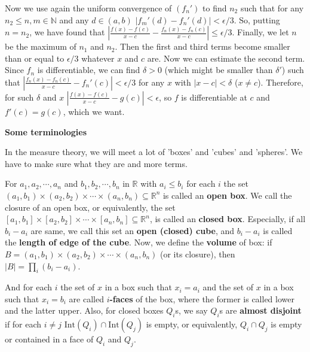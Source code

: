 \documentclass{article}
\newcommand{\NaN}{\mathbb{N}}
\newcommand{\ReR}{\mathbb{R}}
\begin{document}
Now we use again the uniform convergence of $(f_n')$ to find $n_2$ such that for any $n_2 \le n, m \in \NaN$ and any $d \in (a, b)$ $|f_m'(d) - f_n'(d)| < \epsilon/3$.
So, putting $n = n_2$, we have found that $|\frac{f(x) - f(c)}{x -c} - \frac{f_n(x) - f_n(c)}{x -c}| \le \epsilon/3$.
Finally, we let $n$ be the maximum of $n_1$ and $n_2$.
Then the first and third terms become smaller than or equal to $\epsilon/3$ whatever $x$ and $c$ are.
Now we can estimate the second term.
Since $f_n$ is differentiable, we can find $\delta > 0$ (which might be smaller than $\delta'$) such that $|\frac{f_n(x) - f_n(c)}{x -c} - f_n'(c)| < \epsilon/3$ for any $x$ with $|x - c| < \delta$ ($x \ne c$).
Therefore, for such $\delta$ and $x$ $|\frac{f(x) - f(c)}{x -c} - g(c)| < \epsilon$, so $f$ is differentiable at $c$ and $f'(c) = g(c)$, which we want.

\newpage

\textbf{Some terminologies}

In the measure theory, we will meet a lot of 'boxes' and 'cubes' and 'spheres'.
We have to make sure what they are and more terms.

For $a_1, a_2, \cdots, a_n$ and $b_1, b_2, \cdots, b_n$ in $\ReR$ with $a_i \le b_i$ for each $i$ the set $(a_1, b_1) \times (a_2, b_2) \times \cdots \times (a_n, b_n) \subseteq \ReR^n$ is called an \textbf{open box}.
We call the closure of an open box, or equivalently, the set $[a_1, b_1] \times [a_2, b_2] \times \cdots \times [a_n, b_n] \subseteq \ReR^n$, is called an \textbf{closed box}.
Especially, if all $b_i - a_i$ are same, we call this set an \textbf{open (closed) cube}, and $b_i - a_i$ is called the \textbf{length of edge of the cube}.
Now, we define the \textbf{volume} of box: if $B = (a_1, b_1) \times (a_2, b_2) \times \cdots \times (a_n, b_n)$ (or its closure), then $|B| = \prod_i (b_i - a_i)$.

And for each $i$ the set of $x$ in a box such that $x_i = a_i$ and the set of $x$ in a box such that $x_i = b_i$ are called \textbf{$i$-faces} of the box, where the former is called lower and the latter upper.
Also, for closed boxes $Q_i$s, we say $Q_i$s are \textbf{almost disjoint} if for each $i \ne j$ $\mathrm{Int}(Q_i) \cap \mathrm{Int}(Q_j)$ is empty, or equivalently, $Q_i \cap Q_j$ is empty or contained in a face of $Q_i$ and $Q_j$.
\end{document}
